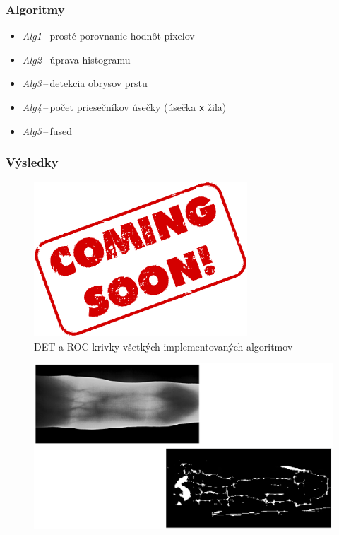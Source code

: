 \documentclass[compress]{beamer}
\begin{document}
\begin{frame}
  \frametitle{Algoritmy}
  \begin{itemize}
    \item \emph{Alg1}\,--\,prosté porovnanie hodnôt pixelov
    \item \emph{Alg2}\,--\,úprava histogramu
    \item \emph{Alg3}\,--\,detekcia obrysov prstu
    \item \emph{Alg4}\,--\,počet priesečníkov úsečky (úsečka \texttt{x} žila)
    \item \emph{Alg5}\,--\,fused
  \end{itemize}
\end{frame}

\begin{frame}
\frametitle{Výsledky}
\begin{figure}[ht!]
	\centering
	\includegraphics[width=8cm]{../fig/all.eps}
	\caption{\label{fig:all} DET a ROC krivky všetkých implementovaných algoritmov}
\end{figure}
\end{frame}

\begin{frame}
\begin{figure}[ht!]
	\centering
	\includegraphics[width=13cm]{../fig/test_orig_pres.eps}
\end{figure}
\end{frame}
\end{document}
